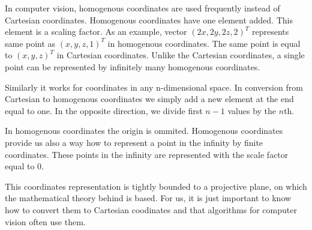 
In computer vision, homogenous coordinates are used frequently instead of
Cartesian coordinates. Homogenous coordinates have one element added. This element
is a scaling factor. As an example, vector $(2x, 2y, 2z, 2)^T$ represents same
point as $(x, y, z, 1)^T$ in homogenous coordinates. The same point is equal to
$(x, y, z)^T$ in Cartesian coordinates. Unlike the Cartesian coordinates, a
single point can be represented by infinitely many homogenous coordinates.

Similarly it works for coordinates in any n-dimensional space. In conversion
from Cartesian to homogenous coordinates we simply add a new element at the end
equal to one. In the opposite direction, we divide first $n-1$ values by the
$n$th.

In homogenous coordinates the origin is ommited. Homogenous coordinates provide
us also a way how to represent a point in the infinity by finite coordinates.
These points in the infinity are represented with the scale factor equal to 0.

This coordinates representation is tightly bounded to a projective plane, on
which the mathematical theory behind is based. For us, it is just important to
know how to convert them to Cartesian coodinates and that algorithms for
computer vision often use them.

